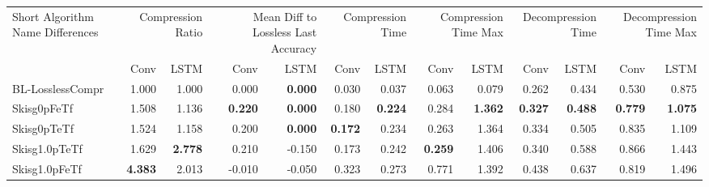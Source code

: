\begin{tabular}{lrrrrrrrrrrrr}
\toprule
\multicolumn{1}{p{2.5cm}}{Short Algorithm Name Differences} & \multicolumn{2}{p{1.8cm}}{Compression Ratio} & \multicolumn{2}{p{1.8cm}}{Mean Diff to Lossless Last Accuracy} & \multicolumn{2}{p{1.8cm}}{Compression Time} & \multicolumn{2}{p{1.8cm}}{Compression Time Max} & \multicolumn{2}{p{1.8cm}}{Decompression Time} & \multicolumn{2}{p{1.8cm}}{Decompression Time Max} \\
 & Conv & LSTM & Conv & LSTM & Conv & LSTM & Conv & LSTM & Conv & LSTM & Conv & LSTM \\
\midrule
BL-LosslessCompr & 1.000 & 1.000 & 0.000 & \bfseries 0.000 & 0.030 & 0.037 & 0.063 & 0.079 & 0.262 & 0.434 & 0.530 & 0.875 \\
Skisg0pFeTf & 1.508 & 1.136 & \bfseries 0.220 & \bfseries 0.000 & 0.180 & \bfseries 0.224 & 0.284 & \bfseries 1.362 & \bfseries 0.327 & \bfseries 0.488 & \bfseries 0.779 & \bfseries 1.075 \\
Skisg0pTeTf & 1.524 & 1.158 & 0.200 & \bfseries 0.000 & \bfseries 0.172 & 0.234 & 0.263 & 1.364 & 0.334 & 0.505 & 0.835 & 1.109 \\
Skisg1.0pTeTf & 1.629 & \bfseries 2.778 & 0.210 & -0.150 & 0.173 & 0.242 & \bfseries 0.259 & 1.406 & 0.340 & 0.588 & 0.866 & 1.443 \\
Skisg1.0pFeTf & \bfseries 4.383 & 2.013 & -0.010 & -0.050 & 0.323 & 0.273 & 0.771 & 1.392 & 0.438 & 0.637 & 0.819 & 1.496 \\
\bottomrule
\end{tabular}
